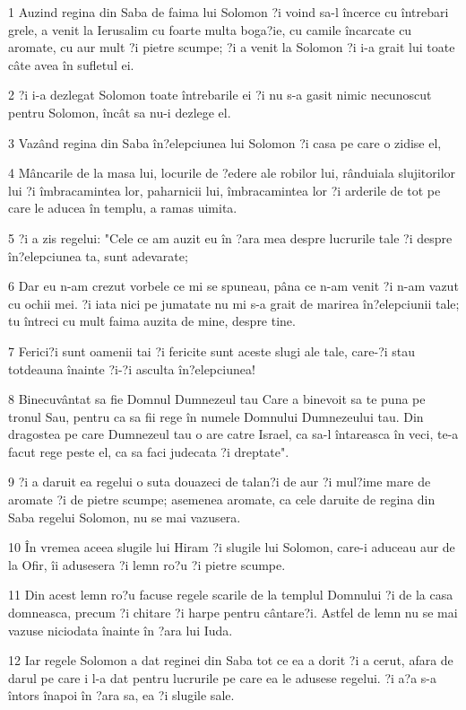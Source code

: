 \par 1 Auzind regina din Saba de faima lui Solomon ?i voind sa-l încerce cu întrebari grele, a venit la Ierusalim cu foarte multa boga?ie, cu camile încarcate cu aromate, cu aur mult ?i pietre scumpe; ?i a venit la Solomon ?i i-a grait lui toate câte avea în sufletul ei.
\par 2 ?i i-a dezlegat Solomon toate întrebarile ei ?i nu s-a gasit nimic necunoscut pentru Solomon, încât sa nu-i dezlege el.
\par 3 Vazând regina din Saba în?elepciunea lui Solomon ?i casa pe care o zidise el,
\par 4 Mâncarile de la masa lui, locurile de ?edere ale robilor lui, rânduiala slujitorilor lui ?i îmbracamintea lor, paharnicii lui, îmbracamintea lor ?i arderile de tot pe care le aducea în templu, a ramas uimita.
\par 5 ?i a zis regelui: "Cele ce am auzit eu în ?ara mea despre lucrurile tale ?i despre în?elepciunea ta, sunt adevarate;
\par 6 Dar eu n-am crezut vorbele ce mi se spuneau, pâna ce n-am venit ?i n-am vazut cu ochii mei. ?i iata nici pe jumatate nu mi s-a grait de marirea în?elepciunii tale; tu întreci cu mult faima auzita de mine, despre tine.
\par 7 Ferici?i sunt oamenii tai ?i fericite sunt aceste slugi ale tale, care-?i stau totdeauna înainte ?i-?i asculta în?elepciunea!
\par 8 Binecuvântat sa fie Domnul Dumnezeul tau Care a binevoit sa te puna pe tronul Sau, pentru ca sa fii rege în numele Domnului Dumnezeului tau. Din dragostea pe care Dumnezeul tau o are catre Israel, ca sa-l întareasca în veci, te-a facut rege peste el, ca sa faci judecata ?i dreptate".
\par 9 ?i a daruit ea regelui o suta douazeci de talan?i de aur ?i mul?ime mare de aromate ?i de pietre scumpe; asemenea aromate, ca cele daruite de regina din Saba regelui Solomon, nu se mai vazusera.
\par 10 În vremea aceea slugile lui Hiram ?i slugile lui Solomon, care-i aduceau aur de la Ofir, îi adusesera ?i lemn ro?u ?i pietre scumpe.
\par 11 Din acest lemn ro?u facuse regele scarile de la templul Domnului ?i de la casa domneasca, precum ?i chitare ?i harpe pentru cântare?i. Astfel de lemn nu se mai vazuse niciodata înainte în ?ara lui Iuda.
\par 12 Iar regele Solomon a dat reginei din Saba tot ce ea a dorit ?i a cerut, afara de darul pe care i l-a dat pentru lucrurile pe care ea le adusese regelui. ?i a?a s-a întors înapoi în ?ara sa, ea ?i slugile sale.
